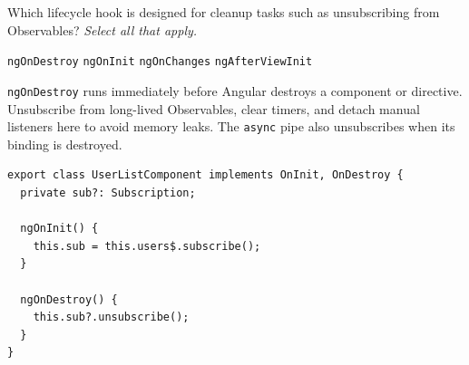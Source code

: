 \question[4]
Which lifecycle hook is designed for cleanup tasks such as unsubscribing from Observables? \emph{Select all that apply.}
\begin{checkboxes}
  \CorrectChoice \lstinline[style=tsinline]|ngOnDestroy|
  \choice \lstinline[style=tsinline]|ngOnInit|
  \choice \lstinline[style=tsinline]|ngOnChanges|
  \choice \lstinline[style=tsinline]|ngAfterViewInit|
\end{checkboxes}
\begin{solution}
  \lstinline[style=tsinline]|ngOnDestroy| runs immediately before Angular destroys a component or directive. Unsubscribe from long-lived Observables, clear timers, and detach manual listeners here to avoid memory leaks. The \lstinline[style=htmlinline]|async| pipe also unsubscribes when its binding is destroyed.
\begin{lstlisting}[style=ts]
export class UserListComponent implements OnInit, OnDestroy {
  private sub?: Subscription;

  ngOnInit() {
    this.sub = this.users$.subscribe();
  }

  ngOnDestroy() {
    this.sub?.unsubscribe();
  }
}
\end{lstlisting}
\end{solution}

